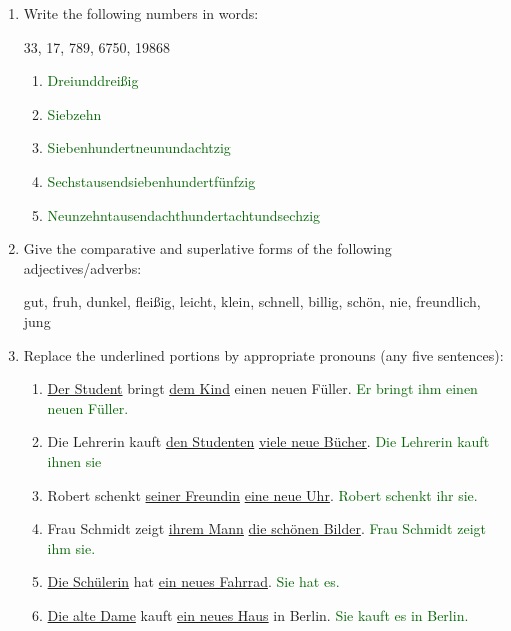 \documentclass{article}
\begin{document}
\begin{enumerate}
    \item Write the following numbers in words:

    33, 17, 789, 6750, 19868
    \begin{enumerate}
        \item \textcolor{darkgreen}{Dreiunddreißig}
        \item \textcolor{darkgreen}{Siebzehn}
        \item \textcolor{darkgreen}{Siebenhundertneunundachtzig}
        \item \textcolor{darkgreen}{Sechstausendsiebenhundertfünfzig}
        \item \textcolor{darkgreen}{Neunzehntausendachthundertachtundsechzig}
    \end{enumerate}

    \item Give the comparative and superlative forms of the following adjectives/adverbs:

    gut, fruh, dunkel, fleißig, leicht, klein, schnell, billig, schön, nie, freundlich, jung

    \item Replace the underlined portions by appropriate pronouns (any five sentences):
    \begin{enumerate}
        \item \underline{Der Student} bringt \underline{dem Kind} einen neuen Füller. \textcolor{darkgreen}{Er bringt ihm einen neuen Füller.}
        \item Die Lehrerin kauft \underline{den Studenten} \underline{viele neue Bücher}. \textcolor{darkgreen}{Die Lehrerin kauft ihnen sie}
        \item Robert schenkt \underline{seiner Freundin} \underline{eine neue Uhr}. \textcolor{darkgreen}{Robert schenkt ihr sie.}
        \item Frau Schmidt zeigt \underline{ihrem Mann} \underline{die schönen Bilder}. \textcolor{darkgreen}{Frau Schmidt zeigt ihm sie.}
        \item \underline{Die Schülerin} hat \underline{ein neues Fahrrad}. \textcolor{darkgreen}{Sie hat es.}
        \item \underline{Die alte Dame} kauft \underline{ein neues Haus} in Berlin. \textcolor{darkgreen}{Sie kauft es in Berlin.}
    \end{enumerate}


\end{enumerate}
\end{document}
